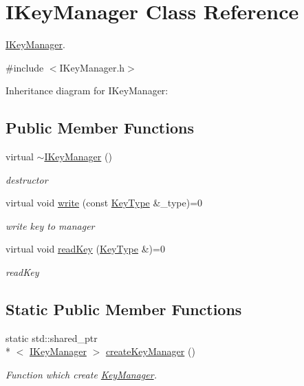 \hypertarget{class_i_key_manager}{\section{I\+Key\+Manager Class Reference}
\label{class_i_key_manager}
}


\hyperlink{class_i_key_manager}{I\+Key\+Manager}.  




{\ttfamily \#include $<$I\+Key\+Manager.\+h$>$}



Inheritance diagram for I\+Key\+Manager\+:
\subsection*{Public Member Functions}
\begin{DoxyCompactItemize}
\item 
virtual \hyperlink{class_i_key_manager_a09a303f3d3dad9ed4d845089136baf7a}{$\sim$\+I\+Key\+Manager} ()
\begin{DoxyCompactList}\small\item\em destructor \end{DoxyCompactList}\item 
virtual void \hyperlink{class_i_key_manager_a3fd6122fd6f7ba22322bd48d5847b519}{write} (const \hyperlink{_i_key_type_8h_aab0feaba617470cb4aa830dc5935238c}{Key\+Type} \&\+\_\+type)=0
\begin{DoxyCompactList}\small\item\em write key to manager \end{DoxyCompactList}\item 
virtual void \hyperlink{class_i_key_manager_a77b2a438486d2014096976b4cc13ee24}{read\+Key} (\hyperlink{_i_key_type_8h_aab0feaba617470cb4aa830dc5935238c}{Key\+Type} \&)=0
\begin{DoxyCompactList}\small\item\em read\+Key \end{DoxyCompactList}\end{DoxyCompactItemize}
\subsection*{Static Public Member Functions}
\begin{DoxyCompactItemize}
\item 
static std\+::shared\+\_\+ptr\\*
$<$ \hyperlink{class_i_key_manager}{I\+Key\+Manager} $>$ \hyperlink{class_i_key_manager_a3b018a432e457eb17883d908744e09ea}{create\+Key\+Manager} ()
\begin{DoxyCompactList}\small\item\em Function which create \hyperlink{class_key_manager}{Key\+Manager}. \end{DoxyCompactList}\end{DoxyCompactItemize}


